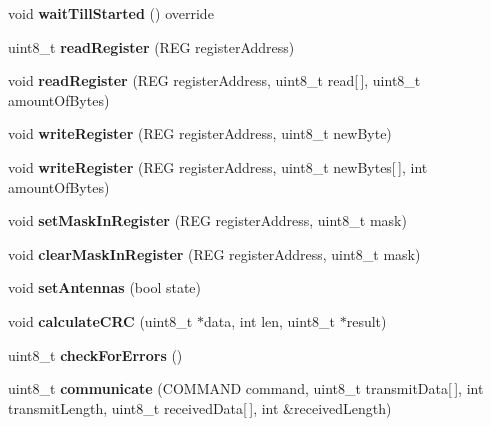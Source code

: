 \begin{DoxyCompactItemize}
\item 
\mbox{\label{class_m_f_r_c522_a6bfefd877c6060dde4eff2c25b7f96f2}} 
void {\bfseries wait\+Till\+Started} () override
\item 
\mbox{\label{class_m_f_r_c522_afe0e86db047ef36af49349e7fdc7fa65}} 
uint8\+\_\+t {\bfseries read\+Register} (R\+EG register\+Address)
\item 
\mbox{\label{class_m_f_r_c522_a559408e38c2c8fea3316f6e2b4477b81}} 
void {\bfseries read\+Register} (R\+EG register\+Address, uint8\+\_\+t read\mbox{[}$\,$\mbox{]}, uint8\+\_\+t amount\+Of\+Bytes)
\item 
\mbox{\label{class_m_f_r_c522_aa976c78dde5b2dfbbd5bcbedaad14a7a}} 
void {\bfseries write\+Register} (R\+EG register\+Address, uint8\+\_\+t new\+Byte)
\item 
\mbox{\label{class_m_f_r_c522_a3558d379575863072c711721b061bb75}} 
void {\bfseries write\+Register} (R\+EG register\+Address, uint8\+\_\+t new\+Bytes\mbox{[}$\,$\mbox{]}, int amount\+Of\+Bytes)
\item 
\mbox{\label{class_m_f_r_c522_ae30686cdd50f6fdb821908a2547e5153}} 
void {\bfseries set\+Mask\+In\+Register} (R\+EG register\+Address, uint8\+\_\+t mask)
\item 
\mbox{\label{class_m_f_r_c522_a9935264b559702a3a4ad2b87735b4f8f}} 
void {\bfseries clear\+Mask\+In\+Register} (R\+EG register\+Address, uint8\+\_\+t mask)
\item 
\mbox{\label{class_m_f_r_c522_ad33cc8218440b30747fba97aa59c0583}} 
void {\bfseries set\+Antennas} (bool state)
\item 
\mbox{\label{class_m_f_r_c522_a4df3a992241adac22f7e0464471c3b94}} 
void {\bfseries calculate\+C\+RC} (uint8\+\_\+t $\ast$data, int len, uint8\+\_\+t $\ast$result)
\item 
\mbox{\label{class_m_f_r_c522_a6d831a60a08c5f37a264c61f7c79c372}} 
uint8\+\_\+t {\bfseries check\+For\+Errors} ()
\item 
\mbox{\label{class_m_f_r_c522_ab605cd58a59f1d6cbc48ef0be252e593}} 
uint8\+\_\+t {\bfseries communicate} (C\+O\+M\+M\+A\+ND command, uint8\+\_\+t transmit\+Data\mbox{[}$\,$\mbox{]}, int transmit\+Length, uint8\+\_\+t received\+Data\mbox{[}$\,$\mbox{]}, int \&received\+Length)
\end{DoxyCompactItemize}
